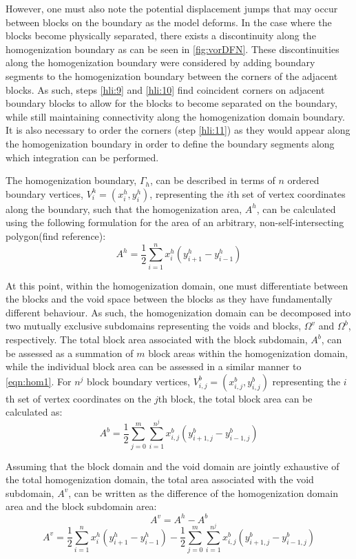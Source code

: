 However, one must also note the potential displacement jumps that may occur between blocks on the boundary as the model deforms. In the case where the blocks become physically separated, there exists a discontinuity along the homogenization boundary as can be seen in \ref{fig:vorDFN}. These discontinuities along the homogenization boundary were considered by adding boundary segments to the homogenization boundary between the corners of the adjacent blocks. As such, steps \ref{hli:9} and \ref{hli:10} find coincident corners on adjacent boundary blocks to allow for the blocks to become separated on the boundary, while still maintaining connectivity along the homogenization domain boundary. It is also necessary to order the corners (step \ref{hli:11}) as they would appear along the homogenization boundary in order to define the boundary segments along which integration can be performed. 

The homogenization boundary, $\Gamma_{h}$, can be described in terms of $n$ ordered boundary vertices, $V_{i}^{h} = (x_{i}^{h}, y_{i}^{h})$, representing the $i$th set of vertex coordinates along the boundary, such that the homogenization area, $A^h$, can be calculated using the following formulation for the area of an arbitrary, non-self-intersecting polygon(find reference):
\begin{equation}
\label{eqn:hom1}
A^h = \dfrac{1}{2} \sum_{i=1}^{n}x_i^h(y_{i+1}^h-y_{i-1}^h)
\end{equation}

At this point, within the homogenization domain, one must differentiate between the blocks and the void space between the blocks as they have fundamentally different behaviour. As such, the homogenization domain can be decomposed into two mutually exclusive subdomains representing the voids and blocks, $\Omega^v$ and $\Omega^b$, respectively. The total block area associated with the block subdomain, $A^b$, can be assessed as a summation of $m$ block areas within the homogenization domain, while the individual block area can be assessed in a similar manner to \ref{eqn:hom1}. For $n^j$ block boundary vertices, $V_{i,j}^{b} = (x_{i,j}^{b}, y_{i,j}^{b})$ representing the $i$th set of vertex coordinates on the $j$th block, the total block area can be calculated as:
\begin{equation}
\label{eqn:hom2}
A^b = \dfrac{1}{2} \sum_{j=0}^{m} \sum_{i=1}^{n^j} x_{i,j}^b(y_{i+1,j}^b-y_{i-1,j}^b)
\end{equation}

Assuming that the block domain and the void domain are jointly exhaustive of the total homogenization domain, the total area associated with the void subdomain, $A^v$, can be written as the difference of the homogenization domain area and the block subdomain area:
\begin{equation}
\label{eqn:hom3}
A^v = A^h - A^b
\end{equation}
\begin{equation}
\label{eqn:hom4}
A^v = \dfrac{1}{2} \sum_{i=1}^{n}x_i^h(y_{i+1}^h-y_{i-1}^h) - \dfrac{1}{2} \sum_{j=0}^{m} \sum_{i=1}^{n^j} x_{i,j}^b(y_{i+1,j}^b-y_{i-1,j}^b)
\end{equation}


